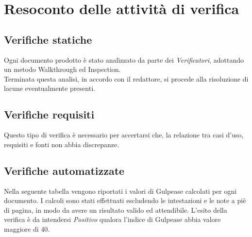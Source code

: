 \section{Resoconto delle attività di verifica}

	\subsection{Verifiche statiche}
		Ogni documento prodotto è stato analizzato da parte dei \textit{Verificatori}, adottando un metodo Walkthrough ed Inspection.\\
		Terminata questa analisi, in accordo con il redattore, si procede alla risoluzione di lacune eventualmente presenti.
	
	\subsection{Verifiche requisiti}
		Questo tipo di verifica è necessario per accertarsi che, la relazione tra casi d'uso, requisiti e fonti non abbia discrepanze.
	
	\subsection{Verifiche automatizzate}
		Nella seguente tabella vengono riportati i valori di Gulpease calcolati per ogni documento.
		I calcoli sono stati effettuati escludendo le intestazioni e le note a piè di pagina, in modo da avere un risultato valido ed attendibile. L'esito della verifica è da intendersi \textit{Positivo} qualora l'indice di Gulpease abbia valore maggiore di 40.
		
